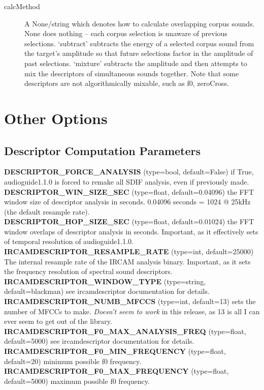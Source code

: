 \documentclass{article}
\newcommand{\optEntry}[4]{\textbf{#1} (type=#2, default=#3) #4\hspace{0.5em}\\}
\newcommand{\ag}{audioguide1.1.0\xspace}
\begin{document}
\begin{spacing}{1.2}
\begin{description}
\item[calcMethod] A None/string which denotes how to calculate overlapping corpus sounds.  None does nothing -- each corpus selection is unaware of previous selections.  `subtract' subtracts the energy of a selected corpus sound from the target's amplitude so that future selections factor in the amplitude of past selections.  `mixture' subtracts the amplitude and then attempts to mix the descriptors of simultaneous sounds together.  Note that some descriptors are not algorithmically mixable, such as f0, zeroCross.
\end{description}




\section{Other Options}
\subsection{Descriptor Computation Parameters}
\optEntry{DESCRIPTOR\_FORCE\_ANALYSIS}{bool}{False}{if True, \ag is forced to remake all SDIF analysis, even if previously made.}

\optEntry{DESCRIPTOR\_WIN\_SIZE\_SEC}{float}{0.04096}{the FFT window size of descriptor analysis in seconds.  0.04096 seconds = 1024 @ 25kHz (the default resample rate).}

\optEntry{DESCRIPTOR\_HOP\_SIZE\_SEC}{float}{0.01024}{the FFT window overlaps of descriptor analysis in seconds.  Important, as it effectively sets of temporal resolution of \ag.}

\optEntry{IRCAMDESCRIPTOR\_RESAMPLE\_RATE}{int}{25000}{The internal resample rate of the IRCAM analysis binary.  Important, as it sets the frequency resolution of spectral sound descriptors.}

\optEntry{IRCAMDESCRIPTOR\_WINDOW\_TYPE}{string}{blackman}{see ircamdescriptor documentation for details.}

\optEntry{IRCAMDESCRIPTOR\_NUMB\_MFCCS}{int}{13}{sets the number of MFCCs to make.  \emph{Doesn't seem to work} in this release, as 13 is all I can ever seem to get out of the library.}

\optEntry{IRCAMDESCRIPTOR\_F0\_MAX\_ANALYSIS\_FREQ}{float}{5000}{see ircamdescriptor documentation for details.}

\optEntry{IRCAMDESCRIPTOR\_F0\_MIN\_FREQUENCY}{float}{20}{minimum possible f0 frequency.}

\optEntry{IRCAMDESCRIPTOR\_F0\_MAX\_FREQUENCY}{float}{5000}{maximum possible f0 frequency.}


\end{spacing}
\end{document}
